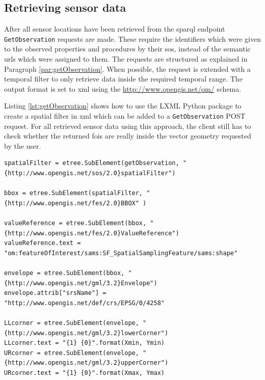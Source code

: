 \subsection{Retrieving sensor data}
\begin{sloppypar}
After all sensor locations have been retrieved from the \ac{sparql} endpoint \texttt{GetObservation} requests are made. These require the identifiers which were given to the observed properties and procedures by their \ac{sos}, instead of the semantic \acp{url} which were assigned to them. The requests are structured as explained in Paragraph \ref{par:getObservation}. When possible, the request is extended with a temporal filter to only retrieve data inside the required temporal range. The output format is set to \ac{xml} using the \url{http://www.opengis.net/om/} schema.
\end{sloppypar}

Listing \ref{lst:getObservation} shows how to use the LXML Python package to create a spatial filter in \ac{xml} which can be added to a \texttt{GetObservation} POST request. For all retrieved sensor data using this approach, the client still has to check whether the returned \acp{foi} are really inside the vector geometry requested by the user. 

\begin{lstlisting}[float,caption={Script that creates an LXML graph object called spatialFilter to add to a \texttt{GetObservaton} POST request}, label={lst:getObservation}]
spatialFilter = etree.SubElement(getObservation, "{http://www.opengis.net/sos/2.0}spatialFilter")

bbox = etree.SubElement(spatialFilter, "{http://www.opengis.net/fes/2.0}BBOX" )

valueReference = etree.SubElement(bbox, "{http://www.opengis.net/fes/2.0}ValueReference")
valueReference.text = "om:featureOfInterest/sams:SF_SpatialSamplingFeature/sams:shape"

envelope = etree.SubElement(bbox, "{http://www.opengis.net/gml/3.2}Envelope")
envelope.attrib["srsName"] = "http://www.opengis.net/def/crs/EPSG/0/4258"

LLcorner = etree.SubElement(envelope, "{http://www.opengis.net/gml/3.2}lowerCorner")
LLcorner.text = "{1} {0}".format(Xmin, Ymin)
URcorner = etree.SubElement(envelope, "{http://www.opengis.net/gml/3.2}upperCorner")
URcorner.text = "{1} {0}".format(Xmax, Ymax)
\end{lstlisting}

